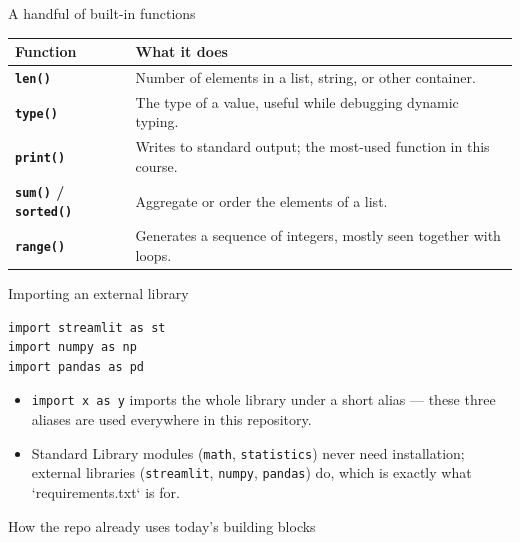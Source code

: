 \begin{frame}{A handful of built-in functions}
\begin{tabularx}{\textwidth}{>{\bfseries}l X}
Function & What it does \\
\toprule
\texttt{len()} & Number of elements in a list, string, or other container. \\
\texttt{type()} & The type of a value, useful while debugging dynamic typing. \\
\texttt{print()} & Writes to standard output; the most-used function in this course. \\
\texttt{sum()} / \texttt{sorted()} & Aggregate or order the elements of a list. \\
\texttt{range()} & Generates a sequence of integers, mostly seen together with loops. \\
\bottomrule
\end{tabularx}
\coursefooter
\end{frame}

\begin{frame}[fragile]{Importing an external library}
\begin{lstlisting}[style=coursepython]
import streamlit as st
import numpy as np
import pandas as pd
\end{lstlisting}
\begin{itemize}
\item \texttt{import x as y} imports the whole library under a short alias --- these three aliases are used everywhere in this repository.
\item Standard Library modules (\texttt{math}, \texttt{statistics}) never need installation; external libraries (\texttt{streamlit}, \texttt{numpy}, \texttt{pandas}) do, which is exactly what `requirements.txt` is for.
\end{itemize}
\coursefooter
\end{frame}

\begin{frame}{How the repo already uses today's building blocks}
\coursefooter
\end{frame}


